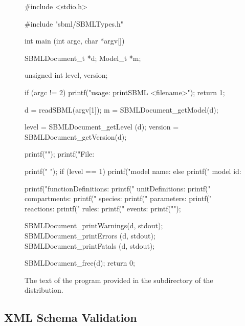 \documentclass{sbmlmanual}
\begin{document}
\begin{figure}
\begin{boxedCodeVerbatim}
#include <stdio.h>

#include "sbml/SBMLTypes.h"

int
main (int argc, char *argv[])
{
  SBMLDocument_t *d;
  Model_t        *m;

  unsigned int level, version;


  if (argc != 2)
  {
    printf("\n  usage: printSBML <filename>\n\n");
    return 1;
  }

  d = readSBML(argv[1]);
  m = SBMLDocument_getModel(d);

  level    = SBMLDocument_getLevel  (d);
  version = SBMLDocument_getVersion(d);

  printf("\n");
  printf("File: %

  printf("         ");
  if (level == 1)
  {
    printf("model name: %
  }
  else
  {
    printf("  model id: %
  }

  printf("functionDefinitions: %
  printf("     unitDefinitions: %
  printf("        compartments: %
  printf("              species: %
  printf("          parameters: %
  printf("           reactions: %
  printf("                rules: %
  printf("               events: %
  printf("\n");

  SBMLDocument_printWarnings(d, stdout);
  SBMLDocument_printErrors   (d, stdout);
  SBMLDocument_printFatals   (d, stdout);

  SBMLDocument_free(d);
  return 0;
}
\end{boxedCodeVerbatim}
\caption{The text of the program  provided in the
   subdirectory of the \libsbml{} distribution.}
\label{fig:printsbml}
\end{figure}
                                        

\subsection{XML Schema Validation}
\label{sec:schema-validation}
\end{document}

